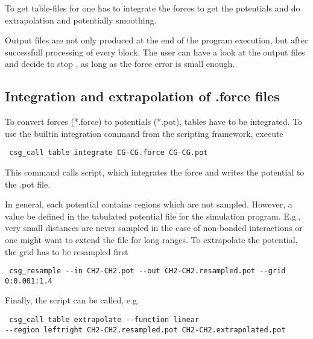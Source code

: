 To get table-files for \gromacs one has to integrate the forces to get the potentials and do extrapolation and potentially smoothing.

Output files are not only produced at the end of the program execution, but after successfull processing of every block. The user can have a look at the output files and decide to stop , as long as the force error is small enough.

\subsection{Integration and extrapolation of .force files }
To convert forces (*.force) to potentials (*.pot), tables have to be integrated. To use the builtin integration command from the scripting framework, execute
\begin{verbatim}
 csg_call table integrate CG-CG.force CG-CG.pot
\end{verbatim}

This command calls  script, which integrates the force and writes the potential to the .pot file.

In general, each potential contains regions which are not sampled. However, a value be defined in the tabulated potential file for the simulation program. E.g., very small distances are never sampled in the case of non-bonded interactions or one might want to extend the file for long ranges. To extrapolate the potential, the grid has to be resampled first
\begin{verbatim}
 csg_resample --in CH2-CH2.pot --out CH2-CH2.resampled.pot --grid 0:0.001:1.4
\end{verbatim}

Finally, the  script can be called, e.g.
\begin{verbatim}
 csg_call table extrapolate --function linear 
--region leftright CH2-CH2.resampled.pot CH2-CH2.extrapolated.pot
\end{verbatim}

